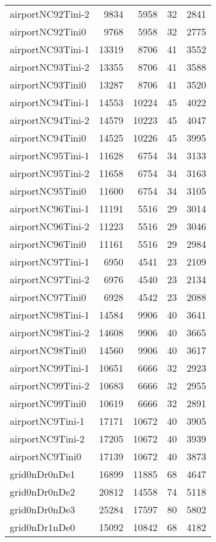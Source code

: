 \begin{longtable}{lrrrr}
airportNC92Tini-2 & 9834 & 5958 & 32 & 2841 \\
airportNC92Tini0 & 9768 & 5958 & 32 & 2775 \\
airportNC93Tini-1 & 13319 & 8706 & 41 & 3552 \\
airportNC93Tini-2 & 13355 & 8706 & 41 & 3588 \\
airportNC93Tini0 & 13287 & 8706 & 41 & 3520 \\
airportNC94Tini-1 & 14553 & 10224 & 45 & 4022 \\
airportNC94Tini-2 & 14579 & 10223 & 45 & 4047 \\
airportNC94Tini0 & 14525 & 10226 & 45 & 3995 \\
airportNC95Tini-1 & 11628 & 6754 & 34 & 3133 \\
airportNC95Tini-2 & 11658 & 6754 & 34 & 3163 \\
airportNC95Tini0 & 11600 & 6754 & 34 & 3105 \\
airportNC96Tini-1 & 11191 & 5516 & 29 & 3014 \\
airportNC96Tini-2 & 11223 & 5516 & 29 & 3046 \\
airportNC96Tini0 & 11161 & 5516 & 29 & 2984 \\
airportNC97Tini-1 & 6950 & 4541 & 23 & 2109 \\
airportNC97Tini-2 & 6976 & 4540 & 23 & 2134 \\
airportNC97Tini0 & 6928 & 4542 & 23 & 2088 \\
airportNC98Tini-1 & 14584 & 9906 & 40 & 3641 \\
airportNC98Tini-2 & 14608 & 9906 & 40 & 3665 \\
airportNC98Tini0 & 14560 & 9906 & 40 & 3617 \\
airportNC99Tini-1 & 10651 & 6666 & 32 & 2923 \\
airportNC99Tini-2 & 10683 & 6666 & 32 & 2955 \\
airportNC99Tini0 & 10619 & 6666 & 32 & 2891 \\
airportNC9Tini-1 & 17171 & 10672 & 40 & 3905 \\
airportNC9Tini-2 & 17205 & 10672 & 40 & 3939 \\
airportNC9Tini0 & 17139 & 10672 & 40 & 3873 \\
grid0nDr0nDe1 & 16899 & 11885 & 68 & 4647 \\
grid0nDr0nDe2 & 20812 & 14558 & 74 & 5118 \\
grid0nDr0nDe3 & 25284 & 17597 & 80 & 5802 \\
grid0nDr1nDe0 & 15092 & 10842 & 68 & 4182 \\

\end{longtable}
